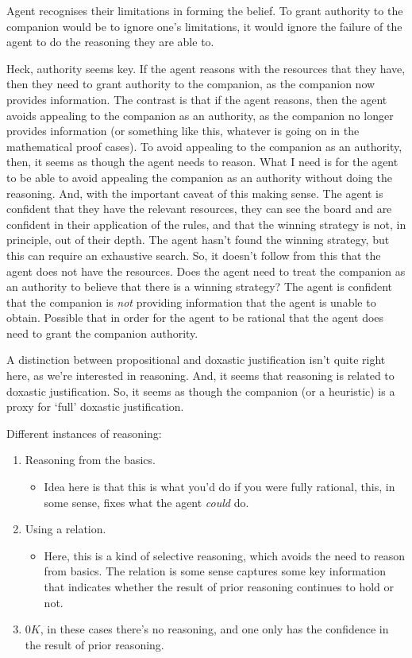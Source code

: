 \documentclass[10pt]{article}
\begin{document}
Agent recognises their limitations in forming the belief.
To grant authority to the companion would be to ignore one's limitations, it would ignore the failure of the agent to do the reasoning they are able to.

Heck, authority seems key.
If the agent reasons with the resources that they have, then they need to grant authority to the companion, as the companion now provides information.
The contrast is that if the agent reasons, then the agent avoids appealing to the companion as an authority, as the companion no longer provides information (or something like this, whatever is going on in the mathematical proof cases).
To avoid appealing to the companion as an authority, then, it seems as though the agent needs to reason.
What I need is for the agent to be able to avoid appealing the companion as an authority without doing the reasoning.
And, with the important caveat of this making sense.
The agent is confident that they have the relevant resources, they can see the board and are confident in their application of the rules, and that the winning strategy is not, in principle, out of their depth.
The agent hasn't found the winning strategy, but this can require an exhaustive search.
So, it doesn't follow from this that the agent does not have the resources.
Does the agent need to treat the companion as an authority to believe that there is a winning strategy?
The agent is confident that the companion is \emph{not} providing information that the agent is unable to obtain.
Possible that in order for the agent to be rational that the agent does need to grant the companion authority.


\begin{note}
  A distinction between propositional and doxastic justification isn't quite right here, as we're interested in reasoning.
  And, it seems that reasoning is related to doxastic justification.
  So, it seems as though the companion (or a heuristic) is a proxy for `full' doxastic justification.
\end{note}

\newpage


Different instances of reasoning:
\begin{enumerate}
\item Reasoning from the basics.
  \begin{itemize}
  \item Idea here is that this is what you'd do if you were fully rational, this, in some sense, fixes what the agent \emph{could} do.
  \end{itemize}
\item Using a relation.
  \begin{itemize}
  \item Here, this is a kind of selective reasoning, which avoids the need to reason from basics.
    The relation is some sense captures some key information that indicates whether the result of prior reasoning continues to hold or not.
  \end{itemize}
\item \(0K\), in these cases there's no reasoning, and one only has the confidence in the result of prior reasoning.
\end{enumerate}
\end{document}
